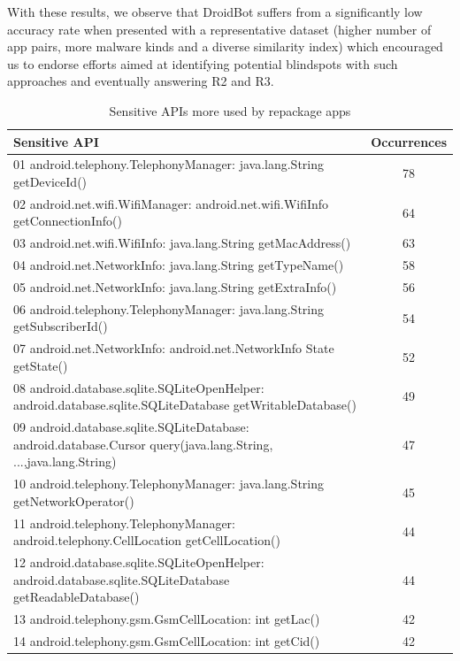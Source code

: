 With these results, we observe that DroidBot suffers from a significantly low accuracy rate when presented with a representative dataset
(higher number of app pairs, more malware kinds and a diverse similarity index) 
which encouraged us to endorse
efforts aimed at identifying potential blindspots with such approaches and eventually answering R2 and R3.



\begin{table}[t]
 \scriptsize
  \caption{Sensitive APIs more used by repackage apps}
  \centering
 \begin{tabular}{lc}

   \toprule
   Sensitive API & Occurrences \\
   \midrule
   01 android.telephony.TelephonyManager: java.lang.String getDeviceId() &  78 \\
   02 android.net.wifi.WifiManager: android.net.wifi.WifiInfo getConnectionInfo() &  64\\
   03 android.net.wifi.WifiInfo: java.lang.String getMacAddress() &  63 \\
   04 android.net.NetworkInfo: java.lang.String getTypeName() &  58 \\
   05 android.net.NetworkInfo: java.lang.String getExtraInfo() &  56 \\
   06 android.telephony.TelephonyManager: java.lang.String getSubscriberId() &  54 \\
   07 android.net.NetworkInfo: android.net.NetworkInfo State getState() &  52 \\
   08 android.database.sqlite.SQLiteOpenHelper: android.database.sqlite.SQLiteDatabase getWritableDatabase() &  49 \\
   09 android.database.sqlite.SQLiteDatabase: android.database.Cursor query(java.lang.String, ...,java.lang.String) &  47 \\
   10 android.telephony.TelephonyManager: java.lang.String getNetworkOperator() &  45\\
   11 android.telephony.TelephonyManager: android.telephony.CellLocation getCellLocation() &  44\\
   12 android.database.sqlite.SQLiteOpenHelper: android.database.sqlite.SQLiteDatabase getReadableDatabase() &  44\\
   13 android.telephony.gsm.GsmCellLocation: int getLac() &  42 \\
   14 android.telephony.gsm.GsmCellLocation: int getCid() &  42 \\
   

\end{tabular}
\end{table}
